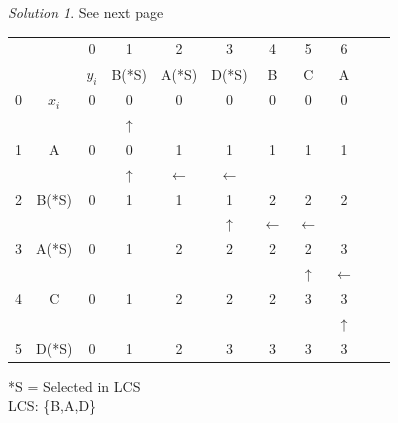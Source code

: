 \documentclass[12pt]{article}
\theoremstyle{remark}
\newtheorem*{solution}{Solution}
\begin{document}
\begin{enumerate}
\begin{enumerate}
    \begin{solution}See next page \\
\begin{center}
\begin{tabular}{ c|c|c|c|c|c|c|c|c|c|c| } 
 & & 0 & 1 & 2 & 3 & 4 & 5 & 6 \\ 
 & & $y_i$ & B(*S) & A(*S) & D(*S) & B & C & A \\ 
\hline 
 0 & $x_i$ & 0 & 0 & 0 & 0 & 0 & 0 & 0 \\ 
\hline 
  &  &  & $\uparrow$ &  &  &  &  &  \\ 
\hline
 1 & A & 0 & 0 & 1 & 1 & 1 & 1 & 1 \\ 
\hline 
  &  &  & $\uparrow$ & $\leftarrow$ & $\leftarrow$ &  &  &  \\ 
\hline
 2 & B(*S) & 0 & 1 & 1 & 1 & 2 & 2 & 2 \\ 
 \hline
  &  &  &  &  & $\uparrow$ & $\leftarrow$ & $\leftarrow$ &  \\ 
\hline
 3 & A(*S) & 0 & 1 & 2 & 2 & 2 & 2 & 3 \\ 
 \hline
  &  &  &  &  &  &  & $\uparrow$ & $\leftarrow$ \\ 
\hline
 4 & C & 0 & 1 & 2 & 2 & 2 & 3 & 3 \\ 
 \hline
  &  &  &  &  &  &  &  & $\uparrow$ \\ 
\hline
 5 & D(*S) & 0 & 1 & 2 & 3 & 3 & 3 & 3 \\ 
 \hline

\end{tabular}
\end{center}
*S = Selected in LCS\\
LCS: \{B,A,D\}
    \end{solution}
    

\end{enumerate}
\end{enumerate}
\end{document}
